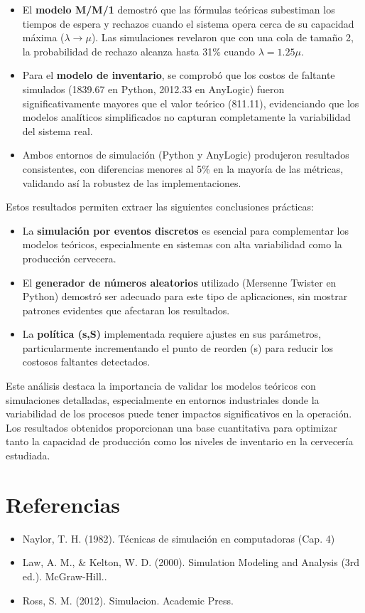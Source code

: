 \documentclass{article}
\begin{document}
\begin{itemize}
    \item El \textbf{modelo M/M/1} demostró que las fórmulas teóricas subestiman los tiempos de espera y rechazos cuando el sistema opera cerca de su capacidad máxima ($\lambda \rightarrow \mu$). Las simulaciones revelaron que con una cola de tamaño 2, la probabilidad de rechazo alcanza hasta 31\% cuando $\lambda = 1.25\mu$.


    \item Para el \textbf{modelo de inventario}, se comprobó que los costos de faltante simulados (1839.67 en Python, 2012.33 en AnyLogic) fueron significativamente mayores que el valor teórico (811.11), evidenciando que los modelos analíticos simplificados no capturan completamente la variabilidad del sistema real.


    \item Ambos entornos de simulación (Python y AnyLogic) produjeron resultados consistentes, con diferencias menores al 5\% en la mayoría de las métricas, validando así la robustez de las implementaciones.
\end{itemize}


Estos resultados permiten extraer las siguientes conclusiones prácticas:


\begin{itemize}
    \item La \textbf{simulación por eventos discretos} es esencial para complementar los modelos teóricos, especialmente en sistemas con alta variabilidad como la producción cervecera.


    \item El \textbf{generador de números aleatorios} utilizado (Mersenne Twister en Python) demostró ser adecuado para este tipo de aplicaciones, sin mostrar patrones evidentes que afectaran los resultados.


    \item La \textbf{política (s,S)} implementada requiere ajustes en sus parámetros, particularmente incrementando el punto de reorden (s) para reducir los costosos faltantes detectados.
\end{itemize}


Este análisis destaca la importancia de validar los modelos teóricos con simulaciones detalladas, especialmente en entornos industriales donde la variabilidad de los procesos puede tener impactos significativos en la operación. Los resultados obtenidos proporcionan una base cuantitativa para optimizar tanto la capacidad de producción como los niveles de inventario en la cervecería estudiada.






\section{Referencias}
\begin{itemize}
    \item Naylor, T. H. (1982). Técnicas de simulación en computadoras (Cap. 4)
    \item Law, A. M., \& Kelton, W. D. (2000). Simulation Modeling and Analysis (3rd ed.). McGraw-Hill..
    \item Ross, S. M. (2012). Simulacion. Academic Press.
 
\end{itemize}
\end{document}
